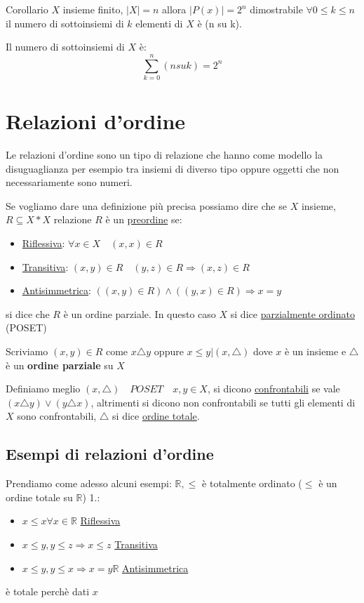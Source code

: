 \documentclass{article}
\begin{document}
Corollario $X$ insieme finito, $|X| = n$ allora $|P(x)| = 2^n$ dimostrabile $\forall 0 \le k \le n$ il numero di sottoinsiemi di $k$ elementi di $X$ è (n su k). \par
Il numero di sottoinsiemi di $X$ è: 
\begin{equation*}
        \sum_{k=0}^{n}(n su k) = 2^n
\end{equation*}






\newpage
\section{Relazioni d'ordine}
Le relazioni d'ordine sono un tipo di relazione che hanno come modello la disuguaglianza per esempio tra insiemi di diverso tipo oppure oggetti che non necessariamente sono numeri. \par
Se vogliamo dare una definizione più precisa possiamo dire che se $ X $  insieme, $ R \subseteq X * X $ relazione $ R $ è un \underline{preordine} se:
\begin{itemize}
        \item \underline{Riflessiva}: $ \forall x \in X \quad (x,x) \in R$ 
        \item \underline{Transitiva}: $ (x,y) \in R \quad (y,z)  \in R \Rightarrow (x,z) \in R$ 
        \item \underline{Antisimmetrica}: $ ((x,y) \in R) \land ((y,x) \in R) \Rightarrow x = y $ 
\end{itemize}

si dice che $ R $ è un ordine parziale. \newline
In questo caso $ X $ si dice \underline{parzialmente ordinato} (POSET) \par
Scriviamo $ (x,y) \in R $ come $ x \triangle y $ oppure $ x \le y | (x, \triangle)$  dove $x$ è un insieme e $ \triangle $ è un \textbf{ordine parziale} su $ X $    

Definiamo meglio $ (x, \triangle) \quad  POSET \quad x,y \in X$, si dicono \underline{confrontabili} se vale $ (x \triangle y) \lor (y \triangle x) $, altrimenti si dicono non confrontabili  se tutti gli elementi di $ X $ sono confrontabili, $ \triangle $ si dice \underline{ordine totale}.  \par


\subsection{Esempi di relazioni d'ordine}
Prendiamo come adesso alcuni esempi: \newline 
$ \mathbb{R}, \le $ è totalmente ordinato ($ \le $ è un ordine totale su $ \mathbb{R} $) 1.:
\begin{itemize}
        \item $ x \le x \forall x \in \mathbb{R} $ \underline{Riflessiva}
        \item $ x \le y, y \le z \Rightarrow x \le z$ \underline{Transitiva}
        \item $ x \le y, y \le x \Rightarrow x=y  \mathbb{R} $ \underline{Antisimmetrica}
\end{itemize}
è totale perchè dati $ x $ \newline
\end{document}
